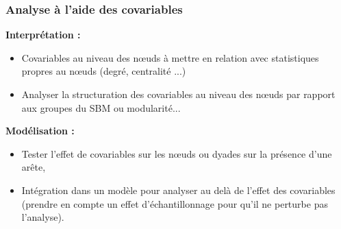 \documentclass[nopagenumber,9pt]{beamer}
\begin{document}
\begin{frame}
\frametitle{Analyse à l'aide des covariables}

\textbf{Interprétation : }
 
 \begin{itemize}
  \item Covariables au niveau des n\oe uds à mettre en relation avec statistiques propres au n\oe uds (degré, centralité ...)
  \item Analyser la structuration des covariables au niveau des n\oe uds par rapport aux groupes du SBM ou modularité...
 \end{itemize}

 
 \bigskip
 
 \textbf{Modélisation :}
 
 \begin{itemize}
  \item Tester l'effet de covariables sur les n\oe uds ou dyades sur la présence d'une ar\^ete,
  \item Intégration dans un modèle pour analyser au delà de l'effet des covariables (prendre en compte un effet d'échantillonnage pour qu'il ne perturbe pas l'analyse).
 \end{itemize}

 
\end{frame}
\end{document}
